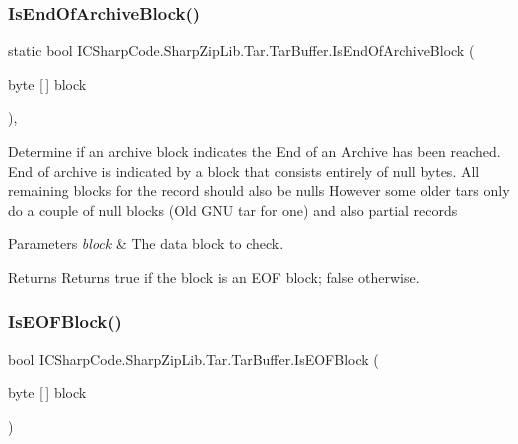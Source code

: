 \subsubsection{\texorpdfstring{Is\+End\+Of\+Archive\+Block()}{IsEndOfArchiveBlock()}}
{\footnotesize\ttfamily static bool I\+C\+Sharp\+Code.\+Sharp\+Zip\+Lib.\+Tar.\+Tar\+Buffer.\+Is\+End\+Of\+Archive\+Block (\begin{DoxyParamCaption}\item[{byte \mbox{[}$\,$\mbox{]}}]{block }\end{DoxyParamCaption})\hspace{0.3cm}{\ttfamily [inline]}, {\ttfamily [static]}}



Determine if an archive block indicates the End of an Archive has been reached. End of archive is indicated by a block that consists entirely of null bytes. All remaining blocks for the record should also be null\textquotesingle{}s However some older tars only do a couple of null blocks (Old G\+NU tar for one) and also partial records 


\begin{DoxyParams}{Parameters}
{\em block} & The data block to check.\\
\hline
\end{DoxyParams}
\begin{DoxyReturn}{Returns}
Returns true if the block is an E\+OF block; false otherwise.
\end{DoxyReturn}
\mbox{\label{class_i_c_sharp_code_1_1_sharp_zip_lib_1_1_tar_1_1_tar_buffer_a2f86e0c8b79e23b9e93a4332f59170e1}} 
\subsubsection{\texorpdfstring{Is\+E\+O\+F\+Block()}{IsEOFBlock()}}
{\footnotesize\ttfamily bool I\+C\+Sharp\+Code.\+Sharp\+Zip\+Lib.\+Tar.\+Tar\+Buffer.\+Is\+E\+O\+F\+Block (\begin{DoxyParamCaption}\item[{byte \mbox{[}$\,$\mbox{]}}]{block }\end{DoxyParamCaption})\hspace{0.3cm}{\ttfamily [inline]}}



